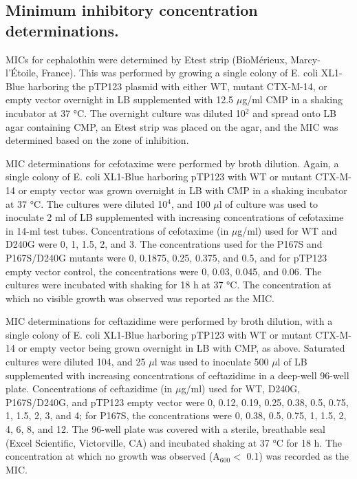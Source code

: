 \documentclass[../main.tex]{subfiles}
\begin{document}
    \subsection{Minimum inhibitory concentration determinations.}
        MICs for cephalothin were determined by Etest strip (BioMérieux, Marcy-l'Étoile, France). This was performed by growing a single colony of E. coli XL1-Blue harboring the pTP123 plasmid with either WT, mutant CTX-M-14, or empty vector overnight in LB supplemented with 12.5 $\mu$g/ml CMP in a shaking incubator at 37 °C. The overnight culture was diluted 10$^{2}$ and spread onto LB agar containing CMP, an Etest strip was placed on the agar, and the MIC was determined based on the zone of inhibition.

        MIC determinations for cefotaxime were performed by broth dilution. Again, a single colony of E. coli XL1-Blue harboring pTP123 with WT or mutant CTX-M-14 or empty vector was grown overnight in LB with CMP in a shaking incubator at 37 °C. The cultures were diluted 10$^{4}$, and 100 $\mu$l of culture was used to inoculate 2 ml of LB supplemented with increasing concentrations of cefotaxime in 14-ml test tubes. Concentrations of cefotaxime (in $\mu$g/ml) used for WT and D240G were 0, 1, 1.5, 2, and 3. The concentrations used for the P167S and P167S/D240G mutants were 0, 0.1875, 0.25, 0.375, and 0.5, and for pTP123 empty vector control, the concentrations were 0, 0.03, 0.045, and 0.06. The cultures were incubated with shaking for 18 h at 37 °C. The concentration at which no visible growth was observed was reported as the MIC.

        MIC determinations for ceftazidime were performed by broth dilution, with a single colony of E. coli XL1-Blue harboring pTP123 with WT or mutant CTX-M-14 or empty vector being grown overnight in LB with CMP, as above. Saturated cultures were diluted 104, and 25 $\mu$l was used to inoculate 500 $\mu$l of LB supplemented with increasing concentrations of ceftazidime in a deep-well 96-well plate. Concentrations of ceftazidime (in $\mu$g/ml) used for WT, D240G, P167S/D240G, and pTP123 empty vector were 0, 0.12, 0.19, 0.25, 0.38, 0.5, 0.75, 1, 1.5, 2, 3, and 4; for P167S, the concentrations were 0, 0.38, 0.5, 0.75, 1, 1.5, 2, 4, 6, 8, and 12. The 96-well plate was covered with a sterile, breathable seal (Excel Scientific, Victorville, CA) and incubated shaking at 37 °C for 18 h. The concentration at which no growth was observed (A$_{600} <$ 0.1) was recorded as the MIC.
\end{document}
